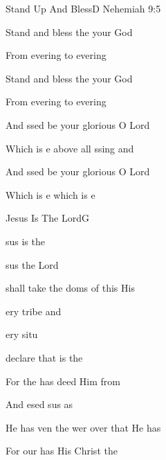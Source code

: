 \documentclass[12pt]{book}
\newcommand{\RevDate}{\today}
\newcommand{\NotCCLIed}{\relax}
\begin{document}
\WBPageBrk
\begin{song}{Stand Up And Bless}{D}
  {}
  {}
  {Nehemiah 9:5}
  {\NotCCLIed}

  \renewcommand{\RevDate}{February~11,~1993}

  \begin{SBOpGroup}
    Stand  and bless the  your God
    
    From evering to evering
    
    Stand  and bless the  your God
    
    From evering to evering
  \end{SBOpGroup}

  \begin{SBChorus}
    And ssed be your glorious  O Lord

    Which is e above all ssing and 

    And ssed be your glorious  O Lord

    Which is e which is e
  \end{SBChorus}
\end{song}


\begin{song}{Jesus Is The Lord}{G}
  {}
  {}
  {}
  {\NotCCLIed}

  \renewcommand{\RevDate}{February~11,~1993}

  \begin{SBOpGroup}
    sus is the 
    
    sus the Lord 
    
     shall take the doms of this   His  
    
    ery tribe and 
    
    ery situ
    
     declare that  is the  
  \end{SBOpGroup}

  \begin{SBChorus}
    For the    has deed Him from 

    And esed sus as  

    He has ven  the wer over  that He has 

    For our  has  His Christ the 
  \end{SBChorus}
\end{song}
\end{document}
